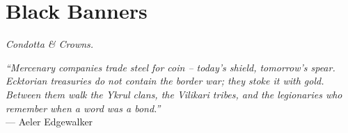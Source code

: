 \documentclass[12pt,oneside]{book}
\begin{document}


\newpage

\chapter{Black Banners}
\emph{Condotta \& Crowns.}

\noindent
\textit{``Mercenary companies trade steel for coin -- today's shield, tomorrow's spear. Ecktorian treasuries do not contain the border war; they stoke it with gold. Between them walk the Ykrul clans, the Vilikari tribes, and the legionaries who remember when a word was a bond.''} \\
--- Aeler Edgewalker

\vspace{1em}
\end{document}
